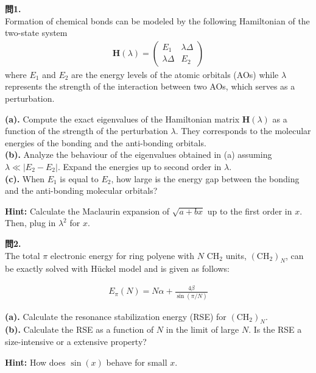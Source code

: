 \documentclass{jlreq}
\begin{document}
\noindent
\textbf{問1.}\\

\noindent
Formation of chemical bonds can be modeled by the following Hamiltonian of the two-state system
\begin{eqnarray}
    \mathbf{H}(\lambda)=
    \begin{pmatrix}
    E_1 & \lambda\Delta \\ 
    \lambda\Delta & E_2
    \end{pmatrix}
\end{eqnarray}
where $E_1$ and $E_2$ are the energy levels of the atomic orbitals (AOs) while $\lambda$ represents the strength of the interaction between two AOs, which serves as a perturbation.

\noindent
\textbf{(a).} Compute the exact eigenvalues of the Hamiltonian matrix $\mathbf{H}(\lambda)$ as a function of the strength of the perturbation $\lambda$. They corresponds to the molecular energies of the bonding and the anti-bonding orbitals.\\
\noindent
\textbf{(b).} Analyze the behaviour of the eigenvalues obtained in (a)  assuming $\lambda \ll |E_2-E_2|$.  Expand the energies up to second order in $\lambda$.\\ 
\noindent
\textbf{(c).} When $E_1$ is equal to $E_2$, how large is the energy gap between the bonding and the anti-bonding molecular orbitals?

\noindent
\textbf{Hint:} Calculate the Maclaurin expansion of $\sqrt{a+bx}$ up to the first order in $x$. Then, plug in $\lambda^2$ for $x$. 

\clearpage

\noindent
\textbf{問2.}\\

\noindent
The total $\pi$ electronic energy for  ring polyene with $N$ $\text{CH}_2$ units, $(\text{CH}_2)_N$, can be exactly solved with H\"uckel model and is given as follows:

\begin{eqnarray}
    E_\pi(N)=N\alpha+\frac{4\beta}{\sin(\pi/N)}
\end{eqnarray}

\noindent
\textbf{(a).} Calculate the resonance stabilization energy (RSE) for  $(\text{CH}_2)_N$.\\
\noindent
\textbf{(b).} Calculate the RSE as a function of $N$ in the limit of large $N$. Is the RSE a size-intensive or a extensive property?

\noindent
\textbf{Hint:} How does $\sin(x)$ behave for small $x$.
\end{document}
